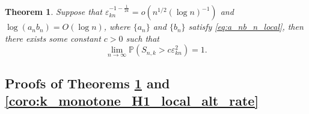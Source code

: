 \documentclass[12pt,letterpaper, twoside, openany]{article}
\theoremstyle{plain}
\newtheorem{theorem}{Theorem}[section]
\newtheorem{corollary}[theorem]{Corollary}
\newtheorem{remark}[theorem]{Remark}
\begin{document}
\begin{theorem}\label{thm:k_monotone_H1_local_alt}
Suppose that $\varepsilon_{kn}^{-1-\frac{1}{2k}} = o(n^{1/2}(\log n)^{-1})$ and $\log(a_n b_n) = O(\log n)$, where $\{a_n\}$ and $\{b_n\}$ satisfy \eqref{eq:a_nb_n_local}, then there exists some constant $c> 0$ such that
\begin{equation*}
    \lim_{n\rightarrow \infty} \mathbb{P} ( S_{n,k} > c \varepsilon_{kn}^2 )  = 1. 
\end{equation*}	
\end{theorem}




    
\subsection{Proofs of Theorems \ref{thm:k_monotone_H1_local_alt}  and \ref{coro:k_monotone_H1_local_alt_rate}}\label{subsect:proofs_app_kmonotone}
\end{document}

